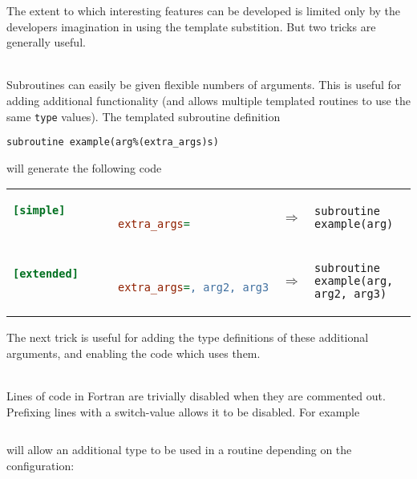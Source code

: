 \documentclass[a4paper,notitlepage,dvipsnames]{scrreprt}
\newcommand\headitem[1]{\needspace{1.5\baselineskip}\item[{\boldmath #1 \nopagebreak}] \hfill \\ \nopagebreak}
\let\code\lstinline
\begin{document}
{{	The extent to which interesting features can be developed is limited only
	by the developers imagination in using the template substition. But two
	tricks are generally useful.

		\begin{description}
		\headitem{Additional optional arguments}
			Subroutines can easily be given flexible numbers of arguments. This
			is useful for adding additional functionality (and allows multiple
			templated routines to use the same \code{type} values). The
			templated subroutine definition
			\begin{lstlisting}[gobble=12]
				subroutine example(arg%(extra_args)s)
			\end{lstlisting}
			will generate the following code

			\begin{minipage}{\textwidth}
			\begin{tabular}{lcl}
			\begin{lstlisting}[language=ini,gobble=16]
				[simple]
				extra_args=
			\end{lstlisting}
			& $\Longrightarrow$ &
			\begin{lstlisting}[gobble=16]
				subroutine example(arg)
			\end{lstlisting} \\[1.5em]

			\begin{lstlisting}[language=ini,gobble=16]
				[extended]
				extra_args=, arg2, arg3
			\end{lstlisting}

			& $\Longrightarrow$ &
			\begin{lstlisting}[gobble=16]
				subroutine example(arg, arg2, arg3)
			\end{lstlisting}
			\end{tabular}
			\end{minipage}

			The next trick is useful for adding the type definitions of these
			additional arguments, and enabling the code which uses them.

		\headitem{Switching off lines of code}
			Lines of code in Fortran are trivially disabled when they are
			commented out. Prefixing lines with a switch-value allows it to be
			disabled. For example
			\begin{lstlisting}[gobble=12]
				%(use_type2)%(type2) :: val()
			\end{lstlisting}
			will allow an additional type to be used in a routine depending on
			the configuration:


\end{description}}}
\end{document}
